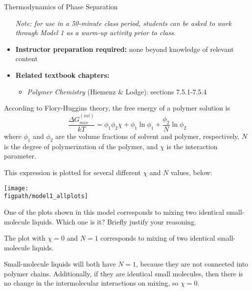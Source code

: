 \begin{activity}{Thermodynamics of Phase Separation}
\begin{instructornotes}
\begin{itemize}
			\emph{Note: for use in a 50-minute class period, students can be asked to work through Model 1 as a warm-up activity prior to class.}
			
		\item \textbf{Instructor preparation required:} none beyond knowledge of relevant content
		\item \textbf{Related textbook chapters:}
			\begin{itemize}
				\item \emph{Polymer Chemistry} (Hiemenz \& Lodge): sections 7.5.1-7.5.4
			\end{itemize}
	\end{itemize}

\end{instructornotes}


\begin{model}

According to Flory-Huggins theory, the free energy of a polymer solution is
\begin{equation*}
	\frac{\Delta G_{mix}^{(int)}}{kT} = \phi_1 \phi_2 \chi + \phi_1 \ln \phi_1 + \frac{\phi_2}{N}\ln \phi_2
\end{equation*}
where $\phi_1$ and $\phi_2$ are the volume fractions of solvent and polymer, respectively, $N$ is the degree of polymerization of the polymer, and $\chi$ is the interaction parameter.

This expression is plotted for several different $\chi$ and $N$ values, below:

\centerline{
	\texttt{[image: \\figpath/model1\_allplots]}}

\end{model}

\begin{ctqs}

	\question One of the plots shown in this model corresponds to mixing two identical small-molecule liquids.  Which one is it?  Briefly justify your reasoning.
	
		\begin{solution}[1.5in]
		
			The plot with $\chi=0$ and $N=1$ corresponds to mixing of two identical small-molecule liquids.
						
			Small-molecule liquids will both have $N=1$, because they are not connected into polymer chains.  Additionally, if they are identical small molecules, then there is no change in the intermolecular interactions on mixing, so $\chi=0$.
			

\end{solution}
\end{ctqs}
\end{activity}
